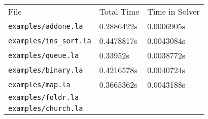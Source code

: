 \begin{tabular}{|l|l|l|}
File & {Total Time} & {Time in Solver}\\
\texttt{examples/addone.la} & 0.2886422s & 0.0006905s \\
\texttt{examples/ins_sort.la} & 0.4478817s & 0.0043084s\\
\texttt{examples/queue.la} & 0.33952s & 0.0038772s\\
\texttt{examples/binary.la} & 0.4216578s & 0.0040724s\\
\texttt{examples/map.la} & 0.3665362s & 0.0043188s\\
\texttt{examples/foldr.la} & &\\
\texttt{examples/church.la} & &
\end{tabular}